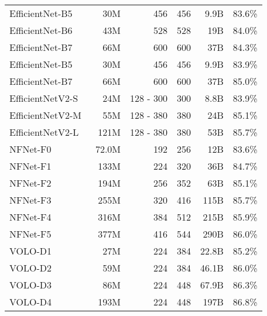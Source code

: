 \documentclass{article}
\begin{document}
\begin{table*}
{\begin{tabular}{lrrrrr}
        EfficientNet-B5~\cite{tan2019efficientnet}        &    30M &       456 & 456 &  9.9B & 83.6\%  \\
        EfficientNet-B6~\cite{tan2019efficientnet}        &    43M &       528 & 528 &   19B & 84.0\%  \\
        EfficientNet-B7~\cite{tan2019efficientnet}        &    66M &       600 & 600 &   37B & 84.3\%  \\ \midrule
        EfficientNet-B5~\cite{cubuk2020randaugment}       &    30M &       456 & 456 &  9.9B & 83.9\%  \\
        EfficientNet-B7~\cite{cubuk2020randaugment}       &    66M &       600 & 600 &   37B & 85.0\%  \\ \midrule
        EfficientNetV2-S~\cite{tan2021efficientnetv2}     &    24M & 128 - 300 & 300 &  8.8B & 83.9\%  \\
        EfficientNetV2-M~\cite{tan2021efficientnetv2}     &    55M & 128 - 380 & 380 &   24B & 85.1\%  \\
        EfficientNetV2-L~\cite{tan2021efficientnetv2}     &   121M & 128 - 380 & 380 &   53B & 85.7\%  \\ \midrule
        NFNet-F0~\cite{brock2021high}                     &  72.0M &       192 & 256 &   12B & 83.6\%  \\
        NFNet-F1~\cite{brock2021high}                     &   133M &       224 & 320 &   36B & 84.7\%  \\
        NFNet-F2~\cite{brock2021high}                     &   194M &       256 & 352 &   63B & 85.1\%  \\
        NFNet-F3~\cite{brock2021high}                     &   255M &       320 & 416 &  115B & 85.7\%  \\
        NFNet-F4~\cite{brock2021high}                     &   316M &       384 & 512 &  215B & 85.9\%  \\ 
        NFNet-F5~\cite{brock2021high}                     &   377M &       416 & 544 &  290B & 86.0\%  \\ \midrule
        VOLO-D1~ \cite{yuan2021volo}                      &    27M &       224 & 384 & 22.8B & 85.2\%  \\
        VOLO-D2~ \cite{yuan2021volo}                      &    59M &       224 & 384 & 46.1B & 86.0\%  \\
        VOLO-D3~ \cite{yuan2021volo}                      &    86M &       224 & 448 & 67.9B & 86.3\%  \\
        VOLO-D4~ \cite{yuan2021volo}                      &   193M &       224 & 448 &  197B & 86.8\%  \\

\end{tabular}}
\end{table*}
\end{document}

